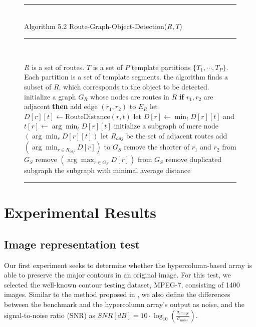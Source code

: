 \documentclass[journal]{IEEEtran}
\newenvironment{myalgorithm}[1]%
{\begin{figure}[!h]\small\noindent\rule{\linewidth}{1pt}\\#1\vspace{-0.5em}\\%
\rule{\linewidth}{0.5pt}\\\vspace{-1.5em}}%
{\vspace{-0.5em}\rule{\linewidth}{1pt}\end{figure}}
\begin{document}
\begin{myalgorithm}{Algorithm 5.2 Route-Graph-Object-Detection($R,T$)}
\begin{algorithmic}[1]
\REQUIRE $R$ is a set of routes. $T$ is a set of $P$ template partitions
$\{T_1,\cdots,T_P\}$. Each partition is a set of template segments.
\ENSURE the algorithm finds a subset of $R$, which corresponds to the object to be detected.
\STATE initialize a graph $G_R$ whose nodes are routes in $R$
  \STATE \textbf{if} $r_1,r_2$ are adjacent \textbf{then} add edge $(r_1,r_2)$ to $E_R$
\ENDFOR
{}
    \STATE let $D[r][t]\leftarrow\mathrm{RouteDistance}(r,t)$
  \ENDFOR
    \STATE let $D[r]\leftarrow\min_t D[r][t]$ and $t[r]\leftarrow\arg\min_t D[r][t]$
  \ENDFOR
    \STATE initialize a subgraph of mere node $(\arg\min_r D[r][t])$
  \ENDFOR
  \REPEAT
      \STATE let $R_{adj}$ be the set of adjacent routes
        \STATE add $(\arg\min_{r\in R_{adj}}D[r])$ to $G_S$
      \ENDIF
        \STATE remove the shorter of $r_1$ and $r_2$ from $G_S$
      \ENDIF
        \STATE remove $(\arg\max_{r\in G_S}D[r])$ from $G_S$
      \ENDIF
    \ENDFOR
    \STATE remove duplicated subgraph
\ENDFOR
\RETURN the subgraph with minimal average distance
\end{algorithmic}
\end{myalgorithm}

\section{Experimental Results}

\subsection{Image representation test}

Our first experiment seeks to determine whether the hypercolumn-based array is able to preserve the major contours in an original image. 
For this test, we selected the well-known contour testing dataset, MPEG-7, consisting of 1400 images. 
Similar to the method proposed in \cite{russ1995}, 
we also define the differences between the benchmark and the hypercolumn array's output as noise, 
and the signal-to-noise ratio (SNR) as $SNR[dB]=10\cdot\log_10(\frac{\sigma_{image}}{\sigma_{noise}})$.
\end{document}
